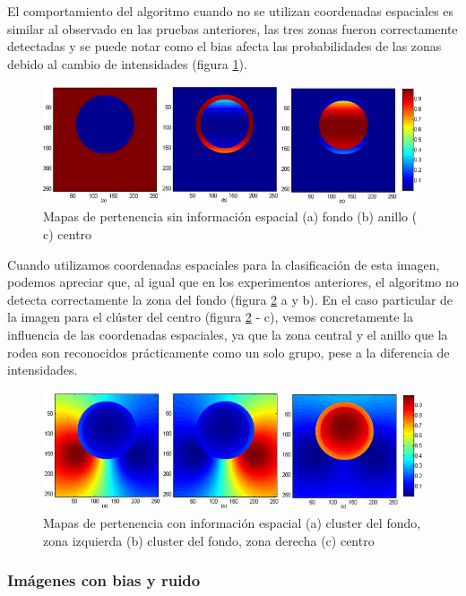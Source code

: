 El comportamiento del algoritmo cuando no se utilizan coordenadas espaciales es similar al observado en las pruebas anteriores, las tres zonas fueron correctamente detectadas y se puede notar como el bias afecta las probabilidades de las zonas debido al cambio de intensidades  (figura \ref{fig:matriz_circulo_bias}).

\begin{figure}[H]
\centering
\includegraphics[scale=0.3]{images/bias_sin_coord.jpg}
\caption{Mapas de pertenencia sin información espacial (a) fondo (b) anillo ( c) centro}
\label{fig:matriz_circulo_bias}
\end{figure}

Cuando utilizamos coordenadas espaciales para la clasificación de esta imagen, podemos apreciar que, al igual que en los experimentos anteriores, el algoritmo no detecta correctamente la zona del fondo (figura \ref{fig:matriz_circulo_bias_espacial} a y b). En el caso particular de la imagen para el clúster del centro (figura \ref{fig:matriz_circulo_bias_espacial} - c), vemos concretamente la influencia de las coordenadas espaciales, ya que la zona central y el anillo que la rodea son reconocidos prácticamente como un solo grupo, pese a la diferencia de intensidades.

\begin{figure}[H]
\centering
\includegraphics[scale=0.3]{images/bias_con_coord.jpg}
\caption{Mapas de pertenencia con información espacial (a) cluster del fondo, zona izquierda (b) cluster del fondo, zona derecha  (c) centro}
\label{fig:matriz_circulo_bias_espacial}
\end{figure}

\subsubsection{Imágenes con bias y ruido}


